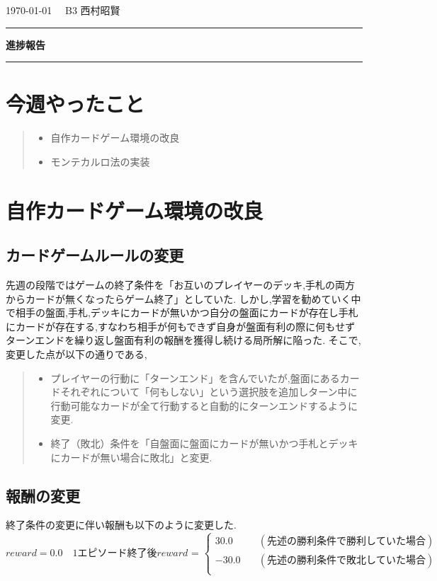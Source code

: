 \documentclass{jarticle}     %
\begin{document}
  \noindent
  \onecolumn
  \hspace{1em}

  \today
  \hfill
  \ \  B3 西村昭賢 

  \vspace{2mm}
  \hrule
  \begin{center}
  {\Large \bf 進捗報告}
  \end{center}
  \hrule
  \vspace{3mm}


\section{今週やったこと}
\begin{quote}
  \begin{itemize}
   \item 自作カードゲーム環境の改良
   \item モンテカルロ法の実装
  \end{itemize}
 \end{quote}


\section{自作カードゲーム環境の改良}


\subsection{カードゲームルールの変更}
先週の段階ではゲームの終了条件を「お互いのプレイヤーのデッキ,手札の両方からカードが無くなったらゲーム終了」としていた.
しかし,学習を勧めていく中で相手の盤面,手札,デッキにカードが無いかつ自分の盤面にカードが存在し手札にカードが存在する,すなわち相手が何もできず自身が盤面有利の際に何もせずターンエンドを繰り返し盤面有利の報酬を獲得し続ける局所解に陥った.
そこで,変更した点が以下の通りである,
\begin{quote}
  \begin{itemize}
   \item プレイヤーの行動に「ターンエンド」を含んでいたが,盤面にあるカードそれぞれについて「何もしない」という選択肢を追加しターン中に行動可能なカードが全て行動すると自動的にターンエンドするように変更.
   \item 終了（敗北）条件を「自盤面に盤面にカードが無いかつ手札とデッキにカードが無い場合に敗北」と変更.
  \end{itemize}
 \end{quote}

\subsection{報酬の変更}
終了条件の変更に伴い報酬も以下のように変更した.
\begin{equation*}
  reward = 0.0
  \quad 
  \mathrm{1 エピソード終了後}
  reward \text{ = }
  \left\{
    \begin{aligned}
        30.0 \quad &(先述の勝利条件で勝利していた場合) \\
        -30.0 \quad  &(先述の勝利条件で敗北していた場合) \\
    \end{aligned}
    \right.
\end{equation*}
\end{document}
